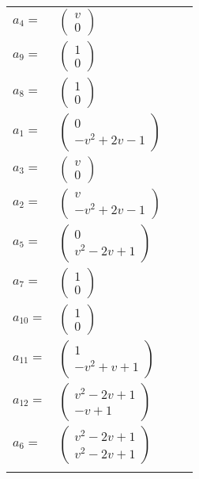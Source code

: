 \documentclass[1p]{elsarticle_modified}
\theoremstyle{definition}
\begin{document}
\begin{tabular}{m{7pt} m{180pt} m{7pt} m{180pt} }
\flushright $a_{4}=$&$\begin{pmatrix}v\\0\end{pmatrix}$ \\
\flushright $a_{9}=$&$\begin{pmatrix}1\\0\end{pmatrix}$ \\
\flushright $a_{8}=$&$\begin{pmatrix}1\\0\end{pmatrix}$ \\
\flushright $a_{1}=$&$\begin{pmatrix}0\\- v^2+2 v-1\end{pmatrix}$ \\
\flushright $a_{3}=$&$\begin{pmatrix}v\\0\end{pmatrix}$ \\
\flushright $a_{2}=$&$\begin{pmatrix}v\\- v^2+2 v-1\end{pmatrix}$ \\
\flushright $a_{5}=$&$\begin{pmatrix}0\\v^2-2 v+1\end{pmatrix}$ \\
\flushright $a_{7}=$&$\begin{pmatrix}1\\0\end{pmatrix}$ \\
\flushright $a_{10}=$&$\begin{pmatrix}1\\0\end{pmatrix}$ \\
\flushright $a_{11}=$&$\begin{pmatrix}1\\- v^2+v+1\end{pmatrix}$ \\
\flushright $a_{12}=$&$\begin{pmatrix}v^2-2 v+1\\- v+1\end{pmatrix}$ \\
\flushright $a_{6}=$&$\begin{pmatrix}v^2-2 v+1\\v^2-2 v+1\end{pmatrix}$\\&\end{tabular}
\end{document}
